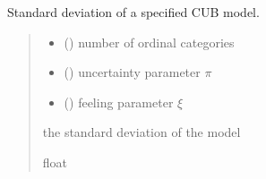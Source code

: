 \documentclass[letterpaper,10pt,english]{sphinxmanual}
\begin{document}
\begin{fulllineitems}
\label{\detokenize{cubmods:cubmods.cub.std}}
\pysigstartsignatures
{}
\pysigstopsignatures
\sphinxAtStartPar
Standard deviation of a specified CUB model.
\begin{quote}\begin{description}
\begin{itemize}
\item {} 
\sphinxAtStartPar
{} () \textendash{} number of ordinal categories

\item {} 
\sphinxAtStartPar
{} () \textendash{} uncertainty parameter \(\pi\)

\item {} 
\sphinxAtStartPar
{} () \textendash{} feeling parameter \(\xi\)

\end{itemize}

\sphinxAtStartPar
the standard deviation of the model

\sphinxAtStartPar
float

\end{description}\end{quote}

\end{fulllineitems}

\end{document}

